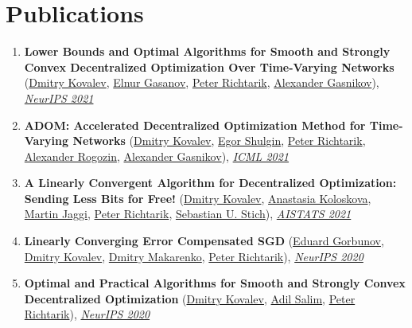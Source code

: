 \section{{Publications}}
\begin{enumerate}
\item \textbf{Lower Bounds and Optimal Algorithms for Smooth and Strongly Convex Decentralized Optimization Over Time-Varying Networks} (\href{https://www.dmitry-kovalev.com}{\color{linkcolour}Dmitry Kovalev}, \href{https://elnurgasanov.com}{\color{linkcolour}Elnur Gasanov}, \href{https://richtarik.org}{\color{linkcolour}Peter Richtarik}, \href{https://scholar.google.ru/citations?user=AmeE8qkAAAAJ}{\color{linkcolour}Alexander Gasnikov}), \href{https://proceedings.neurips.cc/paper/2021/hash/bc37e109d92bdc1ea71da6c919d54907-Abstract.html}{\em \color{black}NeurIPS 2021}
\item \textbf{ADOM: Accelerated Decentralized Optimization Method for Time-Varying Networks} (\href{https://www.dmitry-kovalev.com}{\color{linkcolour}Dmitry Kovalev}, \href{https://shulgin-egor.github.io}{\color{linkcolour}Egor Shulgin}, \href{https://richtarik.org}{\color{linkcolour}Peter Richtarik}, \href{https://scholar.google.com/citations?user=sEjyzkgAAAAJ}{\color{linkcolour}Alexander Rogozin}, \href{https://scholar.google.ru/citations?user=AmeE8qkAAAAJ}{\color{linkcolour}Alexander Gasnikov}), \href{http://proceedings.mlr.press/v139/kovalev21a}{\em \color{black}ICML 2021}
\item \textbf{A Linearly Convergent Algorithm for Decentralized Optimization: Sending Less Bits for Free!} (\href{https://www.dmitry-kovalev.com}{\color{linkcolour}Dmitry Kovalev}, \href{https://scholar.google.com/citations?user=ldJpvE8AAAAJ}{\color{linkcolour}Anastasia Koloskova}, \href{https://people.epfl.ch/martin.jaggi}{\color{linkcolour}Martin Jaggi}, \href{https://richtarik.org}{\color{linkcolour}Peter Richtarik}, \href{https://sstich.ch}{\color{linkcolour}Sebastian U. Stich}), \href{http://proceedings.mlr.press/v130/kovalev21a}{\em \color{black}AISTATS 2021}
\item \textbf{Linearly Converging Error Compensated SGD} (\href{https://eduardgorbunov.github.io}{\color{linkcolour}Eduard Gorbunov}, \href{https://www.dmitry-kovalev.com}{\color{linkcolour}Dmitry Kovalev}, \href{}{\color{linkcolour}Dmitry Makarenko}, \href{https://richtarik.org}{\color{linkcolour}Peter Richtarik}), \href{https://papers.nips.cc/paper/2020/hash/ef9280fbc5317f17d480e4d4f61b3751-Abstract.html}{\em \color{black}NeurIPS 2020}
\item \textbf{Optimal and Practical Algorithms for Smooth and Strongly Convex Decentralized Optimization} (\href{https://www.dmitry-kovalev.com}{\color{linkcolour}Dmitry Kovalev}, \href{https://adil-salim.github.io}{\color{linkcolour}Adil Salim}, \href{https://richtarik.org}{\color{linkcolour}Peter Richtarik}), \href{https://papers.nips.cc/paper/2020/hash/d530d454337fb09964237fecb4bea6ce-Abstract.html}{\em \color{black}NeurIPS 2020}

\end{enumerate}
